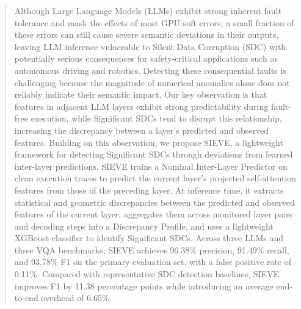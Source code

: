 \begin{abstract}
Although Large Language Models (LLMs) exhibit strong inherent fault tolerance and mask the effects of most GPU soft errors, a small fraction of these errors can still cause severe semantic deviations in their outputs, leaving LLM inference vulnerable to Silent Data Corruption (SDC) with potentially serious consequences for safety-critical applications such as autonomous driving and robotics.
Detecting these consequential faults is challenging because the magnitude of numerical anomalies alone does not reliably indicate their semantic impact.
Our key observation is that features in adjacent LLM layers exhibit strong predictability during fault-free execution, while Significant SDCs tend to disrupt this relationship, increasing the discrepancy between a layer's predicted and observed features.
Building on this observation, we propose SIEVE, a lightweight framework for detecting Significant SDCs through deviations from learned inter-layer predictions.
SIEVE trains a Nominal Inter-Layer Predictor on clean execution traces to predict the current layer's projected self-attention features from those of the preceding layer.
At inference time, it extracts statistical and geometric discrepancies between the predicted and observed features of the current layer, aggregates them across monitored layer pairs and decoding steps into a Discrepancy Profile, and uses a lightweight XGBoost classifier to identify Significant SDCs.
Across three LLMs and three VQA benchmarks, SIEVE achieves 96.38\% precision, 91.49\% recall, and 93.78\% F1 on the primary evaluation set, with a false positive rate of 0.11\%.
Compared with representative SDC detection baselines, SIEVE improves F1 by 11.38 percentage points while introducing an average end-to-end overhead of 6.65\%.
\end{abstract}


